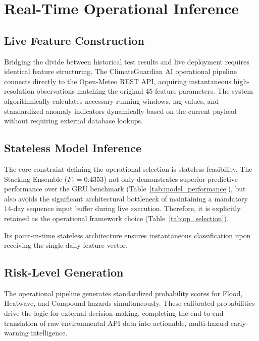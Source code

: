 \section{Real-Time Operational Inference}
\label{sec:realtime}
\subsection{Live Feature Construction}
Bridging the divide between historical test results and live deployment requires identical feature structuring. The ClimateGuardian AI operational pipeline connects directly to the Open-Meteo REST API, acquiring instantaneous high-resolution observations matching the original 45-feature parameters. The system algorithmically calculates necessary running windows, lag values, and standardized anomaly indicators dynamically based on the current payload without requiring external database lookups. 

\subsection{Stateless Model Inference}
The core constraint defining the operational selection is stateless feasibility. The Stacking Ensemble ($F_1 = 0.4353$) not only demonstrates superior predictive performance over the GRU benchmark (Table~\ref{tab:model_performance}), but also avoids the significant architectural bottleneck of maintaining a mandatory 14-day sequence input buffer during live execution. Therefore, it is explicitly retained as the operational framework choice (Table~\ref{tab:op_selection}).

\begin{table}[htbp]
\caption{Operational Model Selection}
\begin{center}
\label{tab:op_selection}
\end{center}
\end{table}
 Its point-in-time stateless architecture ensures instantaneous classification upon receiving the single daily feature vector.

\subsection{Risk-Level Generation}
The operational pipeline generates standardized probability scores for Flood, Heatwave, and Compound hazards simultaneously. These calibrated probabilities drive the logic for external decision-making, completing the end-to-end translation of raw environmental API data into actionable, multi-hazard early-warning intelligence.
